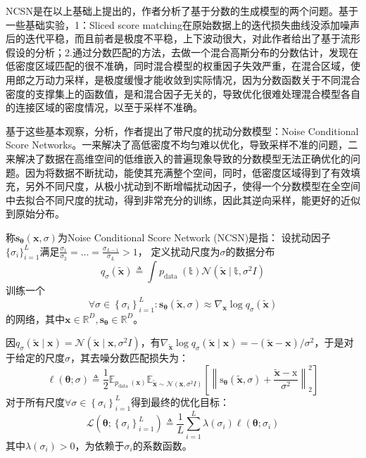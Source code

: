 NCSN是在以上基础上提出的，作者分析了基于分数的生成模型的两个问题。基于一些基础实验，1：Sliced score matching在原始数据上的迭代损失曲线没添加噪声后的迭代平稳，而且前者是极度不平稳，上下波动很大，对此作者给出了基于流形假设的分析；2.通过分数匹配的方法，去做一个混合高斯分布的分数估计，发现在低密度区域匹配的很不准确，同时混合模型的权重因子失效严重，在混合区域，使用郎之万动力采样，是极度缓慢才能收敛到实际情况，因为分数函数关于不同混合密度的支撑集上的函数值，是和混合因子无关的，导致优化很难处理混合模型各自的连接区域的密度情况，以至于采样不准确。

基于这些基本观察，分析，作者提出了带尺度的扰动分数模型：Noise Conditional Score Networks。一来解决了高低密度不均匀难以优化，导致采样不准的问题，二来解决了数据在高维空间的低维嵌入的普遍现象导致的分数模型无法正确优化的问题。因为将数据不断扰动，能使其充满整个空间，同时，低密度区域得到了有效填充，另外不同尺度，从极小扰动到不断增幅扰动因子，使得一个分数模型在全空间中去拟合不同尺度的扰动，得到非常充分的训练，因此其逆向采样，能更好的近似到原始分布。

称$\mathbf{s}_{\boldsymbol{\theta}}(\mathbf{x}, \sigma)$为Noise Conditional Score Network (NCSN)是指：
设扰动因子$\{\sigma_i\}_{i=1}^{L}$满足$\frac{\sigma_1}{\sigma_2}=\dots=\frac{\sigma_{L-1}}{\sigma_L}>1 $，
定义扰动尺度为$\sigma$的数据分布
\begin{equation}
q_\sigma(\tilde{\mathbf{x}}) \triangleq \int p_{\text {data }}(\mathbb{t}) \mathcal{N}(\tilde{\mathbf{x}} \mid \mathbb{t}, \sigma^2I)
\end{equation}
训练一个
\begin{equation}
\forall \sigma \in\left\{\sigma_i\right\}_{i=1}^L: \mathbf{s}_{\boldsymbol{\theta}}(\tilde{\mathbf{x}}, \sigma) \approx \nabla_{\mathbf{x}} \log q_\sigma(\tilde{\mathbf{x}})
\end{equation}
的网络，其中$ \mathbf{x} \in \mathbb{R}^{D}, \mathbf{s}_{\boldsymbol{\theta}} \in \mathbb{R}^{D}$。

因$q_\sigma(\tilde{\mathbf{x}} \mid \mathbf{x})=\mathcal{N}\left(\tilde{\mathbf{x}} \mid \mathbf{x}, \sigma^2 I\right)$，有$\nabla_{\tilde{\mathbf{x}}} \log q_\sigma(\tilde{\mathbf{x}} \mid \mathbf{x})=-(\tilde{\mathbf{x}}-\mathbf{x}) / \sigma^2$，于是对于给定的尺度$\sigma$，其去噪分数匹配损失为：
\begin{equation}
\ell(\boldsymbol{\theta} ; \sigma) \triangleq \frac{1}{2} \mathbb{E}_{p_{\text {data }}(\mathbf{x})} \mathbb{E}_{\tilde{\mathbf{x}} \sim \mathcal{N}\left(\mathbf{x}, \sigma^2 I\right)}\left[\left\|\mathrm{s}_{\boldsymbol{\theta}}(\tilde{\mathbf{x}}, \sigma)+\frac{\tilde{\mathbf{x}}-\mathrm{x}}{\sigma^2}\right\|_2^2\right]
\end{equation}
对于所有尺度$\forall \sigma \in\left\{\sigma_i\right\}_{i=1}^L$得到最终的优化目标：
\begin{equation}
\mathcal{L}\left(\boldsymbol{\theta} ;\left\{\sigma_i\right\}_{i=1}^L\right) \triangleq \frac{1}{L} \sum_{i=1}^L \lambda\left(\sigma_i\right) \ell\left(\boldsymbol{\theta} ; \sigma_i\right)
\end{equation}其中$ \lambda\left(\sigma_i\right)>0$，为依赖于$\sigma_i$的系数函数。

